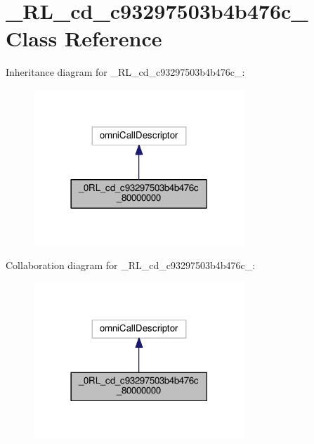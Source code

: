 \hypertarget{class__0_r_l__cd__c93297503b4b476c__80000000}{}\section{\+\_\+R\+L\+\_\+cd\+\_\+c93297503b4b476c\+\_ Class Reference}
\label{class__0_r_l__cd__c93297503b4b476c__80000000}


Inheritance diagram for \+\_\+R\+L\+\_\+cd\+\_\+c93297503b4b476c\+\_\+:
\nopagebreak
\begin{figure}[H]
\begin{center}
\leavevmode
\includegraphics[width=225pt]{class__0_r_l__cd__c93297503b4b476c__80000000__inherit__graph}
\end{center}
\end{figure}


Collaboration diagram for \+\_\+R\+L\+\_\+cd\+\_\+c93297503b4b476c\+\_\+:
\nopagebreak
\begin{figure}[H]
\begin{center}
\leavevmode
\includegraphics[width=225pt]{class__0_r_l__cd__c93297503b4b476c__80000000__coll__graph}
\end{center}
\end{figure}
